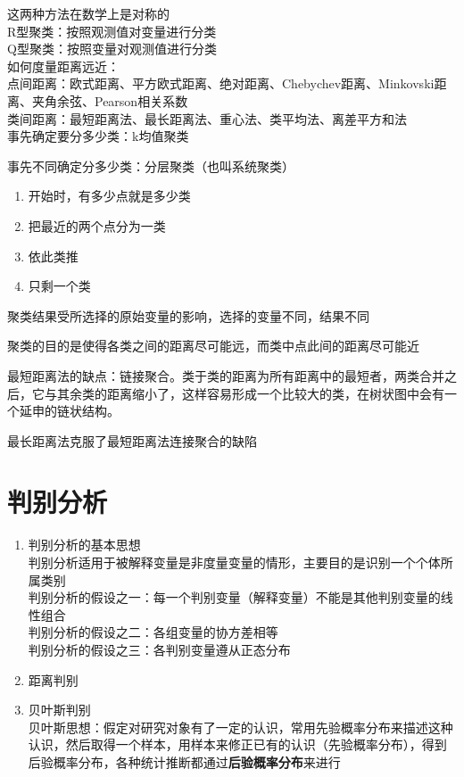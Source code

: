 \documentclass[UTF8,10pt]{book}
\begin{document}
{这两种方法在数学上是对称的\\
R型聚类：按照观测值对变量进行分类\\
Q型聚类：按照变量对观测值进行分类\\


如何度量距离远近：\\
点间距离：欧式距离、平方欧式距离、绝对距离、Chebychev距离、Minkovski距离、夹角余弦、Pearson相关系数\\
类间距离：最短距离法、最长距离法、重心法、类平均法、离差平方和法\\


事先确定要分多少类：k均值聚类

事先不同确定分多少类：分层聚类（也叫系统聚类）


\begin{enumerate}
	\def\labelenumi{\arabic{enumi}.}
	\item
	开始时，有多少点就是多少类
	\item
	把最近的两个点分为一类
	\item
	依此类推
	\item
	只剩一个类
\end{enumerate}

聚类结果受所选择的原始变量的影响，选择的变量不同，结果不同

聚类的目的是使得各类之间的距离尽可能远，而类中点此间的距离尽可能近

最短距离法的缺点：链接聚合。类于类的距离为所有距离中的最短者，两类合并之后，它与其余类的距离缩小了，这样容易形成一个比较大的类，在树状图中会有一个延申的链状结构。

最长距离法克服了最短距离法连接聚合的缺陷

\section{判别分析 }\label{header-n49}

\begin{enumerate}
	\def\labelenumi{\arabic{enumi}.}
	\item
	判别分析的基本思想\\
	判别分析适用于被解释变量是非度量变量的情形，主要目的是识别一个个体所属类别\\
	判别分析的假设之一：每一个判别变量（解释变量）不能是其他判别变量的线性组合\\
	判别分析的假设之二：各组变量的协方差相等\\
	判别分析的假设之三：各判别变量遵从正态分布
	\item
	距离判别
	\item
	贝叶斯判别\\
	贝叶斯思想：{\kaishu 假定对研究对象有了一定的认识，常用先验概率分布来描述这种认识，然后取得一个样本，用样本来修正已有的认识（先验概率分布），得到后验概率分布，各种统计推断都通过\textbf{后验概率分布}来进行}
	

\end{enumerate}}
\end{document}
